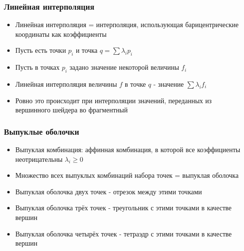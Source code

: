 \documentclass{beamer}
\begin{document}
\begin{frame}[fragile]
\frametitle{Линейная интерполяция}
\begin{itemize}
\item Линейная интерполяция = интерполяция, использующая барицентрические координаты как коэффициенты
\pause
\item Пусть есть точки \begin{math}p_i\end{math} и точка \begin{math}q = \sum \lambda_i p_i\end{math}
\pause
\item Пусть в точках \begin{math}p_i\end{math} задано значение некоторой величины \begin{math}f_i\end{math}
\pause
\item Линейная интерполяция величины \begin{math}f\end{math} в точке \begin{math}q\end{math} - значение \begin{math}\sum \lambda_i f_i\end{math}
\pause
\item Ровно это происходит при интерполяции значений, переданных из вершинного шейдера во фрагментный
\end{itemize}
\end{frame}

\begin{frame}[fragile]
\frametitle{Выпуклые оболочки}
\begin{itemize}
\item Выпуклая комбинация: аффинная комбинация, в которой все коэффициенты неотрицательны \begin{math}\lambda_i \geq 0\end{math}
\pause
\item Множество всех выпуклых комбинаций набора точек = выпуклая оболочка
\pause
\item Выпуклая оболочка двух точек - отрезок между этими точками
\pause
\item Выпуклая оболочка трёх точек - треугольник с этими точками в качестве вершин
\pause
\item Выпуклая оболочка четырёх точек - тетраэдр с этими точками в качестве вершин
\end{itemize}
\end{frame}
\end{document}
